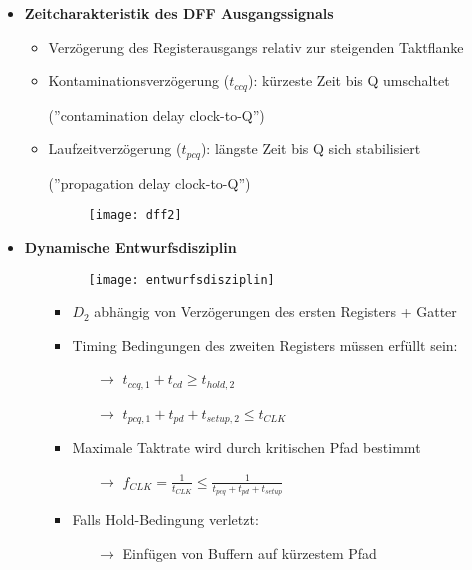 \begin{itemize}
\item \textbf{Zeitcharakteristik des DFF Ausgangssignals}
	\begin{itemize}
	\item Verzögerung des Registerausgangs relativ zur steigenden Taktflanke
	\item Kontaminationsverzögerung ($t_{ccq}$): kürzeste Zeit bis Q umschaltet
	\item[] (''contamination delay clock-to-Q'')
	\item Laufzeitverzögerung ($t_{pcq}$): längste Zeit bis Q sich stabilisiert
	\item[] (''propagation delay clock-to-Q'')\\
	\item[] \begin{figure}[H]
				\begin{center}
				\texttt{[image: dff2]}
				\end{center}
			\end{figure}
	\end{itemize}

\item \textbf{Dynamische Entwurfsdisziplin}
	\begin{itemize}
	\item[]		
				\begin{minipage}{0.25\textwidth}
					\begin{figure}[H]
					\texttt{[image: entwurfsdisziplin]}
					\end{figure}
				\end{minipage}
				\begin{minipage}[t]{0.65\textwidth}
					\vspace{-2.25cm}
					\begin{itemize}
					\item $D_2$ abhängig von Verzögerungen des ersten Registers + Gatter
					\item Timing Bedingungen des zweiten Registers müssen erfüllt sein:
						\begin{itemize}
						\item[$\rightarrow$] $t_{ccq,1}+t_{cd} \geq t_{hold,2}$
						\item[$\rightarrow$] $t_{pcq,1}+t_{pd} + t_{setup,2} \leq t_{CLK}$
						\end{itemize}
					
					\item Maximale Taktrate wird durch kritischen Pfad bestimmt
						\begin{itemize}
						\item[$\rightarrow$] $f_{CLK}=\frac{1}{t_{CLK}} \leq \frac{1}{t_{pcq}+t_{pd}+t_{setup}}$
						\end{itemize}
					\item Falls Hold-Bedingung verletzt: 
						\begin{itemize}
						\item[$\rightarrow$] Einfügen von Buffern auf kürzestem Pfad
						\end{itemize}
					\end{itemize}
				\end{minipage}
	\end{itemize}
	

\end{itemize}
